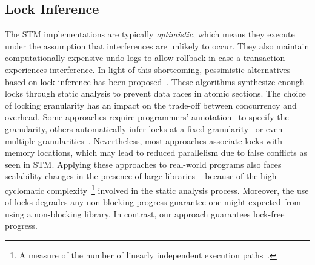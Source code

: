 \documentclass[10pt,conference,compsocconf]{IEEEtran}
\begin{document}
\subsection{Lock Inference}
The STM implementations are typically \emph{optimistic}, which means they execute under the assumption that interferences are unlikely to occur.
They also maintain computationally expensive undo-logs to allow rollback in case a transaction experiences interference.
In light of this shortcoming, pessimistic alternatives based on lock inference has been proposed~\cite{mccloskey2006autolocker}.
These algorithms synthesize enough locks through static analysis to prevent data races in atomic sections.
The choice of locking granularity has an impact on the trade-off between concurrency and overhead.
Some approaches require programmers' annotation~\cite{golan2013concurrent} to specify the granularity, others automatically infer locks at a fixed granularity~\cite{emmi2007lock} or even multiple granularities~\cite{cherem2008inferring}.
Nevertheless, most approaches associate locks with memory locations, which may lead to reduced parallelism due to false conflicts as seen in STM. 
Applying these approaches to real-world programs also faces scalability changes in the presence of large libraries ~\cite{gudka2012lock} because of the high cyclomatic complexity~\footnote{A measure of the number of linearly independent execution paths~\cite{mccabe1976complexity}.} involved in the static analysis process.
Moreover, the use of locks degrades any non-blocking progress guarantee one might expected from using a non-blocking library.
In contrast, our approach guarantees lock-free progress.
\end{document}
